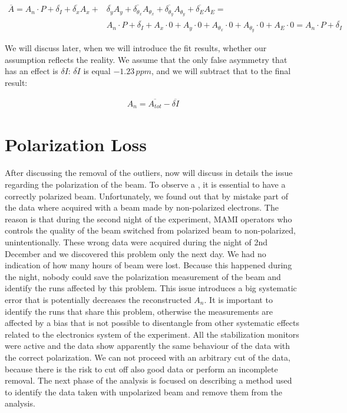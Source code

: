 \begin{align} \label{eq:CancelOut}
\overline{A} = A_{n} \cdot P + \overline{\delta_{I}} + \overline{\delta_{x}}A_{x} + & \overline{\delta_{y}} A_{y} + \overline{\delta_{\theta_{x}}} A_{\theta_{x}} + \overline{\delta_{\theta_{y}}} A_{\theta_{y}} + \overline{\delta_{E}}A_{E} = \\
& A_{n} \cdot P + \overline{\delta_{I}} + A_{x}\cdot 0 + A_{y} \cdot 0 +  A_{\theta_{x}} \cdot 0 +  A_{\theta_{y}} \cdot 0 + A_{E} \cdot 0 = A_{n} \cdot P + \overline{\delta_{I}}
\end{align}  

We will discuss later, when we will introduce the fit results, whether our assumption reflects the reality. We assume that the only false asymmetry that has an effect is $\delta I$: $\overline{\delta I}$ is equal $-1.23 \, ppm$, and we will subtract that to the final result:

\begin{align*}
A_{n} = \overline{A_{tot}} - \overline{\delta I}
\end{align*}

\section{Polarization Loss}

After discussing the removal of the outliers, now will discuss in details the issue regarding the polarization of the beam. To observe a \transv, it is essential to have a correctly polarized beam.
Unfortunately, we found out that by mistake part of the data where acquired with a beam made by non-polarized electrons. The reason is that during the second night of the experiment, MAMI operators who controls the quality of the beam switched from polarized beam to non-polarized, unintentionally. These wrong data were acquired during the night of 2nd December and we discovered this problem only the next day. We had no indication of how many hours of beam were lost. Because this happened during the night, nobody could save the polarization measurement of the beam and identify the runs affected by this problem.
This issue introduces a big systematic error that is potentially decreases the reconstructed $A_{n}$. It is important to identify the runs that share this problem, otherwise the measurements are affected by a bias that is not possible to disentangle from other systematic effects related to the electronics system of the experiment. 
All the stabilization monitors were active and the data show apparently the same behaviour of the data with the correct polarization. We can not proceed with an arbitrary cut of the data, because there is the risk to cut off also good data or perform an incomplete removal. The next phase of the analysis is focused on describing a method used to identify the data taken with unpolarized beam and remove them from the analysis.
 
